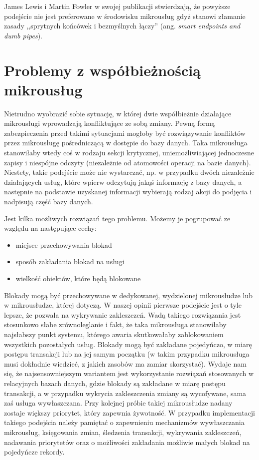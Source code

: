\documentclass[licencjacka]{pracamgr}
\begin{document}
James Lewis i Martin Fowler w swojej publikacji \cite{fowlermicroservices}
stwierdzają, że powyższe podejście nie jest preferowane w środowisku mikrousług
gdyż stanowi złamanie zasady ,,sprytnych końcówek i bezmyślnych łączy'' (ang.
\textit{smart endpoints and dumb pipes}).

\section{Problemy z współbieżnością mikrousług}

Nietrudno wyobrazić sobie sytuację, w której dwie współbieżnie działające mikrousługi
wprowadzają konfliktujące ze sobą zmiany. Pewną formą zabezpieczenia przed takimi sytuacjami
mogłoby być rozwiązywanie konfliktów przez mikrousługę pośredniczącą w dostępie do bazy danych.
Taka mikrousługa stanowiłaby wtedy coś w rodzaju sekcji krytycznej, uniemożliwiającej jednoczesne zapisy
i niespójne odczyty (niezależnie od atomowości operacji na bazie danych). 
Niestety, takie podejście może nie wystarczać, np. w przypadku dwóch niezależnie działających usług, które wpierw
odczytują jakąś informację z bazy danych, a następnie na podstawie uzyskanej informacji wybierają rodzaj
akcji do podjęcia i nadpisują część bazy danych.

Jest kilka możliwych rozwiązań tego problemu. Możemy je pogrupować ze względu na następujące cechy:
\begin{itemize}
	\item miejsce przechowywania blokad
	\item sposób zakładania blokad na usługi
	\item wielkość obiektów, które będą blokowane
\end{itemize}
Blokady mogą być przechowywane w dedykowanej, wydzielonej mikrousłudze lub w mikrousłudze, której dotyczą. W naszej opinii
pierwsze podejście jest o tyle lepsze, że pozwala na wykrywanie zakleszczeń. Wadą takiego rozwiązania jest
stosunkowo słabe zrównoleglanie i fakt, że taka mikrousługa stanowiłaby najsłabszy punkt systemu, którego awaria
skutkowałaby zablokowaniem wszystkich pozostałych usług. Blokady mogą być zakładane pojedyńczo, w miarę
postępu transakcji lub na jej samym początku (w takim przypadku mikrousługa musi dokładnie wiedzieć, z jakich
zasobów ma zamiar skorzystać). Wydaje nam się, że najsensowniejszym wariantem jest wykorzystanie rozwiązań
stosowanych w relacyjnych bazach danych, gdzie blokady są zakładane w miarę postępu transakcji, a w przypadku
wykrycia zakleszczenia zmiany są wycofywane, sama zaś usługa wywłaszczana. Przy kolejnej próbie takiej mikrousłudze
nadany zostaje większy priorytet, który zapewnia żywotność. W przypadku implementacji takiego podejścia należy
pamiętać o zapewnieniu mechanizmów wywłaszczania mikrousług, księgowania zmian, śledzenia transakcji, wykrywania
zakleszczeń, nadawania priorytetów oraz o możliwości zakładania możliwie małych blokad na pojedyńcze rekordy.
\end{document}
